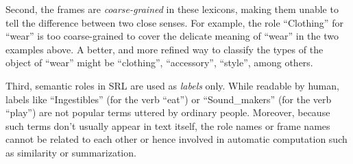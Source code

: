 Second, the frames are {\em coarse-grained}
in these lexicons, making them unable to tell the
difference between two close senses.
For example, the role ``Clothing'' for ``wear'' is
too coarse-grained to cover the delicate meaning of ``wear''
in the two examples above.
A better, and more refined way
to classify the types of the object of ``wear'' might be
``clothing'', ``accessory'', ``style'', among others.

Third, semantic roles in SRL are used as {\em labels} only.
While readable by human, labels like ``Ingestibles''
(for the verb ``eat'') or
``Sound\_makers'' (for the verb ``play'')
are not popular terms uttered by ordinary people.
Moreover, because such terms don't usually appear in text itself,
the role names or frame names cannot be related to each other
or hence involved in automatic computation such as similarity or
summarization.

%

